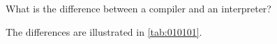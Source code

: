 \begin{exercise}\label{ex:010101}
    What is the difference between a compiler and an interpreter?
\end{exercise}
\begin{solution}\label{sol:010101}
    The differences are illustrated in \autoref{tab:010101}.
    
\end{solution}